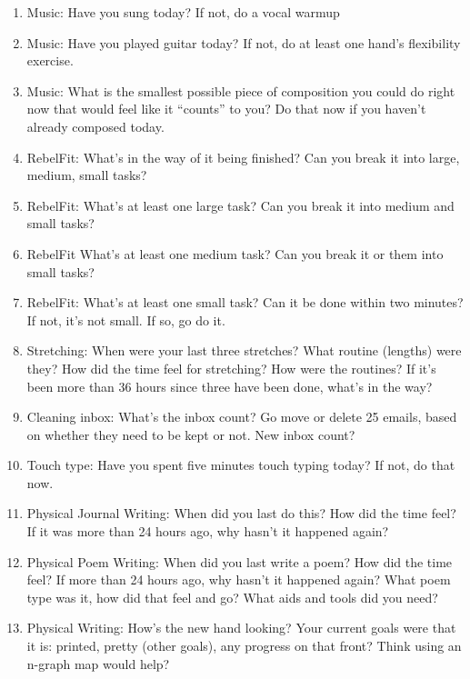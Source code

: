 \documentclass[12pt]{article}
\newcommand{\say}[1]{``#1''}
\renewcommand{\,}{\textsuperscript{,}}
\begin{document}
\begin{enumerate}
\item Music: Have you sung today? If not, do a vocal warmup

\item Music: Have you played guitar today? If not, do at least one hand's flexibility exercise.

\item Music: What is the smallest possible piece of composition you could do right now that would feel like it \say{counts} to you? Do that now if you haven't already composed today.

\item RebelFit: What's in the way of it being finished? Can you break it into large, medium, small tasks?

\item RebelFit: What's at least one large task? Can you break it into medium and small tasks?

\item RebelFit What's at least one medium task? Can you break it or them into small tasks?

\item RebelFit: What's at least one small task? Can it be done within two minutes? If not, it's not small. If so, go do it.

\item Stretching: When were your last three stretches? What routine (lengths) were they? How did the time feel for stretching? How were the routines? If it's been more than 36 hours since three have been done, what's in the way?

\item Cleaning inbox: What's the inbox count? Go move or delete 25 emails, based on whether they need to be kept or not. New inbox count?

\item Touch type: Have you spent five minutes touch typing today? If not, do that now.

\item Physical Journal Writing: When did you last do this? How did the time feel? If it was more than 24 hours ago, why hasn't it happened again?

\item Physical Poem Writing: When did you last write a poem? How did the time feel? If more than 24 hours ago, why hasn't it happened again? What poem type was it, how did that feel and go? What aids and tools did you need?

\item Physical Writing: How's the new hand looking? Your current goals were that it is: printed, pretty (other goals), any progress on that front? Think using an n-graph map would help?


\end{enumerate}
\end{document}
